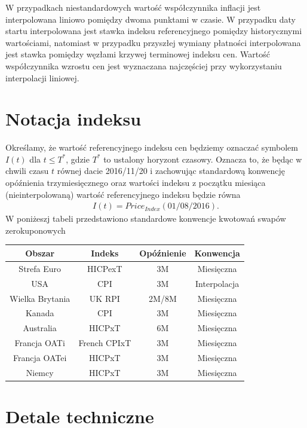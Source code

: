 \documentclass{mini}
\theoremstyle{mythstyle}
\begin{document}
	W przypadkach niestandardowych wartość współczynnika inflacji jest interpolowana liniowo pomiędzy dwoma punktami w czasie. W przypadku daty startu interpolowana jest stawka indeksu referencyjnego pomiędzy historycznymi wartościami, natomiast w przypadku przyszłej wymiany płatności interpolowana jest stawka pomiędzy węzłami krzywej terminowej indeksu cen. Wartość współczynnika wzrostu cen jest wyznaczana najczęściej przy wykorzystaniu interpolacji liniowej.
	
	\section{Notacja indeksu}
	
	Określamy, że wartość referencyjnego indeksu cen będziemy oznaczać symbolem $I(t)$ dla $t \le T^*$, gdzie $T^*$ to ustalony horyzont czasowy. Oznacza to, że będąc w chwili czasu $t$ równej dacie 2016/11/20 i zachowując standardową konwencję opóźnienia trzymiesięcznego oraz wartości indeksu z początku miesiąca (nieinterpolowaną) wartość referencyjnego indeksu będzie równa
	\begin{eqnarray*}
		I(t) = Price_{Index}(01/08/2016).
	\end{eqnarray*}
	W poniżeszj tabeli przedstawiono standardowe konwencje kwotowań swapów zerokuponowych
	\begin{center}
		\begin{tabular}{c c c c}
			\textbf{Obszar} & \textbf{Indeks}  & \textbf{Opóźnienie} & \textbf{Konwencja}\\ \hline
			Strefa Euro & HICPexT & 3M & Miesięczna \\
			USA & CPI & 3M & Interpolacja \\
			Wielka Brytania & UK RPI & 2M/8M & Miesięczna \\
			Kanada & CPI & 3M & Miesięczna \\
			Australia & HICPxT & 6M & Miesięczna \\
			Francja OATi & French CPIxT & 3M & Miesięczna \\
			Francja OATei& HICPxT & 3M & Miesięczna \\
			Niemcy & HICPxT & 3M & Miesięczna
		\end{tabular}
	\end{center}
	
	\section{Detale techniczne}
	
\end{document}
